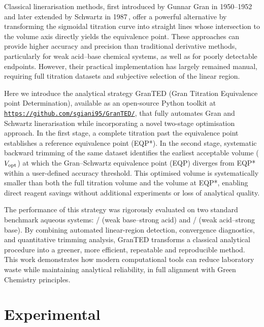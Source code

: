 \documentclass[twoside,twocolumn,9pt]{article}
\begin{document}
Classical linerarisation methods, first introduced by Gunnar Gran in 1950--1952\,\cite{Gran1950,Gran1952} and later extended by Schwartz in 1987\,\cite{Schwartz1987}, offer a powerful alternative by transforming the sigmoidal titration curve into straight lines whose intersection to the volume axis directly yields the equivalence point.
These approaches can provide higher accuracy and precision than traditional derivative methods, particularly for weak acid--base chemical systems, as well as for poorly detectable endpoints.
However, their practical implementation has largely remained manual, requiring full titration datasets and subjective selection of the linear region.\cite{Macc1989, MICHALOWSKI2005, Martin}

Here we introduce the analytical strategy \textsf{GranTED} (Gran Titration Equivalence point Determination), available as an open-source Python toolkit at \href{https://github.com/sgiani95/GranTED/}{\texttt{https://github.com/sgiani95/GranTED/}}, that fully automates Gran and Schwartz linerarisation while incorporating a novel two-stage optimisation approach.
In the first stage, a complete titration past the equivalence point establishes a reference equivalence point (EQP*).
In the second stage, systematic backward trimming of the same dataset identifies the earliest acceptable volume (\(V_{\rm opt}\)) at which the Gran--Schwartz equivalence point (EQP) diverges from EQP* within a user-defined accuracy threshold.
This optimised volume is systematically smaller than both the full titration volume and the volume at EQP*, enabling direct reagent savings without additional experiments or loss of analytical quality.

The performance of this strategy was rigorously evaluated on two standard benchmark aqueous systems: / (weak base--strong acid) and / (weak acid--strong base). By combining automated linear-region detection, convergence diagnostics, and quantitative trimming analysis, \textsf{GranTED} transforms a classical analytical procedure into a greener, more efficient, repeatable and reproducible method.
This work demonstrates how modern computational tools can reduce laboratory waste while maintaining analytical reliability, in full alignment with Green Chemistry principles.

\section*{Experimental}
\end{document}

